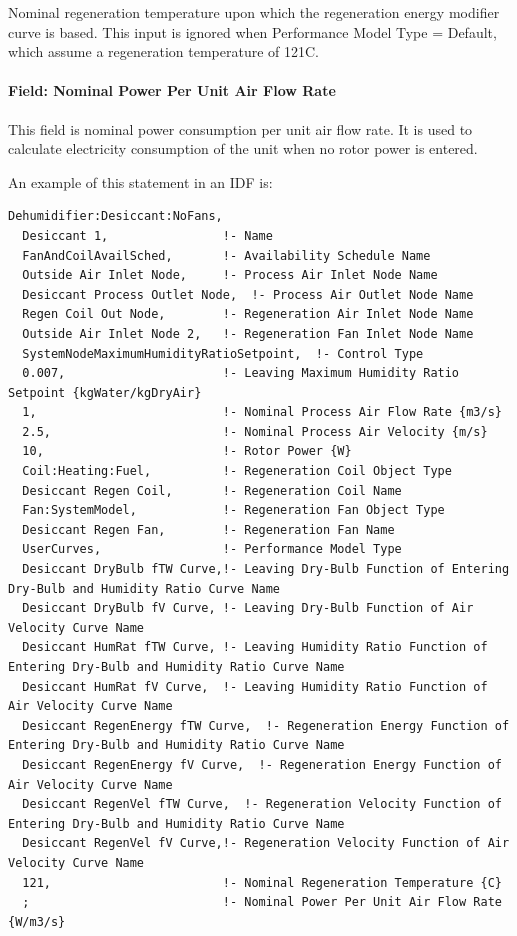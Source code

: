 Nominal regeneration temperature upon which the regeneration energy modifier curve is based. This input is ignored when Performance Model Type = Default, which assume a regeneration temperature of 121C.

\paragraph{Field: Nominal Power Per Unit Air Flow Rate}\label{field-nominal-power-per-unit-air-flow-rate}

This field is nominal power consumption per unit air flow rate. It is used to calculate electricity consumption of the unit when no rotor power is entered.

An example of this statement in an IDF is:

\begin{lstlisting}
Dehumidifier:Desiccant:NoFans,
  Desiccant 1,                !- Name
  FanAndCoilAvailSched,       !- Availability Schedule Name
  Outside Air Inlet Node,     !- Process Air Inlet Node Name
  Desiccant Process Outlet Node,  !- Process Air Outlet Node Name
  Regen Coil Out Node,        !- Regeneration Air Inlet Node Name
  Outside Air Inlet Node 2,   !- Regeneration Fan Inlet Node Name
  SystemNodeMaximumHumidityRatioSetpoint,  !- Control Type
  0.007,                      !- Leaving Maximum Humidity Ratio Setpoint {kgWater/kgDryAir}
  1,                          !- Nominal Process Air Flow Rate {m3/s}
  2.5,                        !- Nominal Process Air Velocity {m/s}
  10,                         !- Rotor Power {W}
  Coil:Heating:Fuel,          !- Regeneration Coil Object Type
  Desiccant Regen Coil,       !- Regeneration Coil Name
  Fan:SystemModel,            !- Regeneration Fan Object Type
  Desiccant Regen Fan,        !- Regeneration Fan Name
  UserCurves,                 !- Performance Model Type
  Desiccant DryBulb fTW Curve,!- Leaving Dry-Bulb Function of Entering Dry-Bulb and Humidity Ratio Curve Name
  Desiccant DryBulb fV Curve, !- Leaving Dry-Bulb Function of Air Velocity Curve Name
  Desiccant HumRat fTW Curve, !- Leaving Humidity Ratio Function of Entering Dry-Bulb and Humidity Ratio Curve Name
  Desiccant HumRat fV Curve,  !- Leaving Humidity Ratio Function of Air Velocity Curve Name
  Desiccant RegenEnergy fTW Curve,  !- Regeneration Energy Function of Entering Dry-Bulb and Humidity Ratio Curve Name
  Desiccant RegenEnergy fV Curve,  !- Regeneration Energy Function of Air Velocity Curve Name
  Desiccant RegenVel fTW Curve,  !- Regeneration Velocity Function of Entering Dry-Bulb and Humidity Ratio Curve Name
  Desiccant RegenVel fV Curve,!- Regeneration Velocity Function of Air Velocity Curve Name
  121,                        !- Nominal Regeneration Temperature {C}
  ;                           !- Nominal Power Per Unit Air Flow Rate {W/m3/s}
\end{lstlisting}

